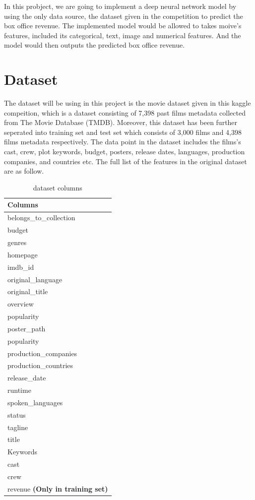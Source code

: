 \documentclass{article}
\begin{document}
In this probject, we are going to implement a deep neural network model by using the only data source, the dataset given in the competition to predict the box office revenue. The implemented model would be allowed to takes moive's features, included its categorical, text, image and numerical features. And the model would then outputs the predicted box office revenue.

\section{Dataset}

The dataset will be using in this project is the movie dataset given in this kaggle compeition, which is a dataset consisting of 7,398 past films metadata  collected from The Movie Database (TMDB). Moreover, this dataset has been further seperated into training set and test set which consists of 3,000 films and 4,398 films metadata respectively. The data point in the dataset includes the films's cast, crew, plot keywords, budget, posters, release dates, languages, production companies, and countries etc. The full list of the features in the original dataset are as follow.

\begin{table}[htb]
	\caption{dataset columns}
	\label{sample-table}
	\centering
	\begin{tabular}{l}
		\toprule
		\cmidrule{1-1}
		Columns  \\
		\midrule
		belongs\_to\_collection \\
		budget  \\
		genres \\
		homepage  \\
		imdb\_id  \\
		original\_language \\
		original\_title	  \\
		overview  \\
		popularity  \\
		poster\_path  \\
		popularity  \\
		production\_companies \\
		production\_countries \\
		release\_date \\
		runtime \\
		spoken\_languages \\
		status \\
		tagline \\
		title \\
		Keywords \\
		cast \\
		crew \\
		revenue \textbf{(Only in training set)}\\
		\midrule
	\end{tabular}
\end{table}
\end{document}
